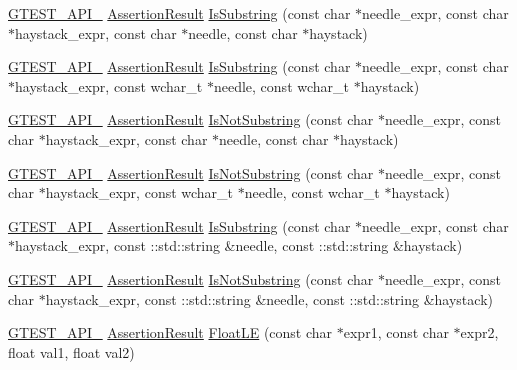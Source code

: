 \begin{DoxyCompactItemize}
\item 
\hyperlink{gtest-port_8h_aa73be6f0ba4a7456180a94904ce17790}{G\+T\+E\+S\+T\+\_\+\+A\+P\+I\+\_\+} \hyperlink{classtesting_1_1_assertion_result}{Assertion\+Result} \hyperlink{namespacetesting_a390c4f66fe7e9098117eb77e5fffa4ad}{Is\+Substring} (const char $\ast$needle\+\_\+expr, const char $\ast$haystack\+\_\+expr, const char $\ast$needle, const char $\ast$haystack)
\item 
\hyperlink{gtest-port_8h_aa73be6f0ba4a7456180a94904ce17790}{G\+T\+E\+S\+T\+\_\+\+A\+P\+I\+\_\+} \hyperlink{classtesting_1_1_assertion_result}{Assertion\+Result} \hyperlink{namespacetesting_aa1c82529c7591d2a9fd016de45dd9113}{Is\+Substring} (const char $\ast$needle\+\_\+expr, const char $\ast$haystack\+\_\+expr, const wchar\+\_\+t $\ast$needle, const wchar\+\_\+t $\ast$haystack)
\item 
\hyperlink{gtest-port_8h_aa73be6f0ba4a7456180a94904ce17790}{G\+T\+E\+S\+T\+\_\+\+A\+P\+I\+\_\+} \hyperlink{classtesting_1_1_assertion_result}{Assertion\+Result} \hyperlink{namespacetesting_a2288dcf4249f88af67dcd46544dc49a6}{Is\+Not\+Substring} (const char $\ast$needle\+\_\+expr, const char $\ast$haystack\+\_\+expr, const char $\ast$needle, const char $\ast$haystack)
\item 
\hyperlink{gtest-port_8h_aa73be6f0ba4a7456180a94904ce17790}{G\+T\+E\+S\+T\+\_\+\+A\+P\+I\+\_\+} \hyperlink{classtesting_1_1_assertion_result}{Assertion\+Result} \hyperlink{namespacetesting_a53e5c6e91ea429c43de7f4f57e33d166}{Is\+Not\+Substring} (const char $\ast$needle\+\_\+expr, const char $\ast$haystack\+\_\+expr, const wchar\+\_\+t $\ast$needle, const wchar\+\_\+t $\ast$haystack)
\item 
\hyperlink{gtest-port_8h_aa73be6f0ba4a7456180a94904ce17790}{G\+T\+E\+S\+T\+\_\+\+A\+P\+I\+\_\+} \hyperlink{classtesting_1_1_assertion_result}{Assertion\+Result} \hyperlink{namespacetesting_a571c7edcfc574269833ebe3e7d338ec5}{Is\+Substring} (const char $\ast$needle\+\_\+expr, const char $\ast$haystack\+\_\+expr, const \+::std\+::string \&needle, const \+::std\+::string \&haystack)
\item 
\hyperlink{gtest-port_8h_aa73be6f0ba4a7456180a94904ce17790}{G\+T\+E\+S\+T\+\_\+\+A\+P\+I\+\_\+} \hyperlink{classtesting_1_1_assertion_result}{Assertion\+Result} \hyperlink{namespacetesting_abe7b3fa1c9528745f934d4a14155ea87}{Is\+Not\+Substring} (const char $\ast$needle\+\_\+expr, const char $\ast$haystack\+\_\+expr, const \+::std\+::string \&needle, const \+::std\+::string \&haystack)
\item 
\hyperlink{gtest-port_8h_aa73be6f0ba4a7456180a94904ce17790}{G\+T\+E\+S\+T\+\_\+\+A\+P\+I\+\_\+} \hyperlink{classtesting_1_1_assertion_result}{Assertion\+Result} \hyperlink{namespacetesting_a2c9a2a391c72a7b02ea3024586e33af0}{Float\+LE} (const char $\ast$expr1, const char $\ast$expr2, float val1, float val2)

\end{DoxyCompactItemize}
